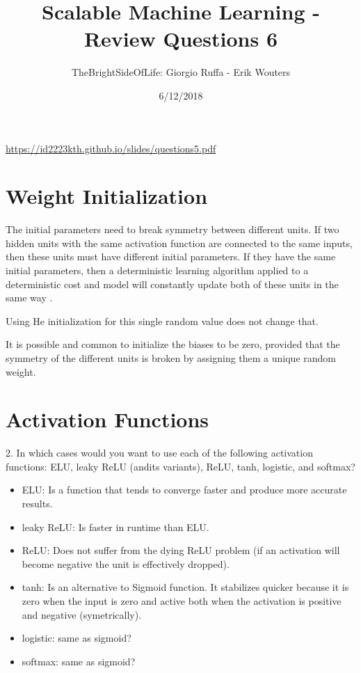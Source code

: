 \documentclass[a4paper]{article}
\title{Scalable Machine Learning - Review Questions 6}
\author{TheBrightSideOfLife: Giorgio Ruffa - Erik Wouters}
\date{6/12/2018}
\begin{document}
\maketitle

\url{https://id2223kth.github.io/slides/questions5.pdf}

\section{Weight Initialization}
The initial parameters need to break symmetry between different units. If two hidden units with the same activation function are connected to the same inputs, then these units must have different initial parameters. If they have the same initial parameters, then a deterministic learning algorithm applied to a deterministic cost and model will constantly update both of these units in the same way \cite[p.~301]{Goodfellow-et-al-2016}.

Using He initialization for this single random value does not change that.

It is possible and common to initialize the biases to be zero, provided that the symmetry of the different units is broken by assigning them a unique random weight.

\section{Activation Functions}
2. In which cases would you want to use each of the following activation functions: ELU, leaky ReLU (andits variants), ReLU, tanh, logistic, and softmax?

\begin{itemize}
\item ELU: Is a function that tends to converge faster and produce more accurate results.
\item leaky ReLU: Is faster in runtime than ELU.
\item ReLU: Does not suffer from the dying ReLU problem (if an activation will become negative the unit is effectively dropped).
\item tanh: Is an alternative to Sigmoid function. It stabilizes quicker because it is zero when the input is zero and active both when the activation is positive and negative (symetrically).
\item logistic: same as sigmoid?
\item softmax: same as sigmoid?
\end{itemize}
\end{document}
